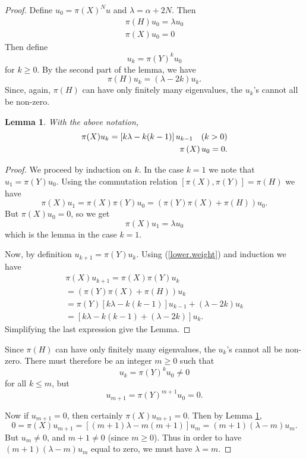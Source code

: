 \documentclass[12pt]{amsbook}
\theoremstyle{plain}
\newtheorem{lemma}[theorem]{Lemma}
\numberwithin{equation}{chapter}
\numberwithin{theorem}{chapter}
\begin{document}
\begin{proof}
Define $u_{0}=\pi(X)^{N}u$ and $\lambda=\alpha+2N$. Then
\begin{align}
\pi(H)u_{0}=\lambda u_{0}\label{weight}\\
\pi(X)u_{0}=0\label{kill}%
\end{align}
Then define
\[
u_{k}=\pi(Y)^{k}u_{0}%
\]
for $k\geq0$. By the second part of the lemma, we have
\begin{equation}
\pi(H)u_{k}=\left(  \lambda-2k\right)  u_{k}\text{.}\label{lower.weight}%
\end{equation}
Since, again, $\pi(H)$ can have only finitely many eigenvalues, the $u_{k}$'s
cannot all be non-zero.

\begin{lemma}
\label{raising}With the above notation,
\begin{align*}
\pi(X)u_{k}=\left[  k\lambda-k(k-1)\right]  u_{k-1}\text{\quad}(k>0)\\
\pi\left(  X\right)  u_{0}=0.
\end{align*}
\end{lemma}

\begin{proof}
We proceed by induction on $k$. In the case $k=1$ we note that $u_{1}%
=\pi(Y)u_{0}$. Using the commutation relation $\left[  \pi(X),\pi(Y)\right]
=\pi(H)$ we have
\[
\pi(X)u_{1}=\pi(X)\pi(Y)u_{0}=\left(  \pi(Y)\pi(X)+\pi(H)\right)
u_{0}\text{.}%
\]
But $\pi(X)u_{0}=0$, so we get
\[
\pi(X)u_{1}=\lambda u_{0}%
\]
which is the lemma in the case $k=1$.

Now, by definition $u_{k+1}=\pi(Y)u_{k}$. Using (\ref{lower.weight}) and
induction we have
\begin{align*}
\pi(X)u_{k+1}=\pi(X)\pi(Y)u_{k}\\
=\left(  \pi(Y)\pi(X)+\pi(H)\right)  u_{k}\\
=\pi(Y)\left[  k\lambda-k(k-1)\right]  u_{k-1}+(\lambda-2k)u_{k}\\
=\left[  k\lambda-k(k-1)+(\lambda-2k)\right]  u_{k}\text{.}%
\end{align*}
Simplifying the last expression give the Lemma.
\end{proof}

Since $\pi(H)$ can have only finitely many eigenvalues, the $u_{k}$'s cannot
all be non-zero. There must therefore be an integer $m\geq0$ such that
\[
u_{k}=\pi(Y)^{k}u_{0}\neq0
\]
for all $k\leq m$, but
\[
u_{m+1}=\pi(Y)^{m+1}u_{0}=0\text{.}%
\]

Now if $u_{m+1}=0$, then certainly $\pi(X)u_{m+1}=0$. Then by Lemma
\ref{raising},
\[
0=\pi(X)u_{m+1}=\left[  (m+1)\lambda-m(m+1)\right]  u_{m}=(m+1)(\lambda
-m)u_{m}\text{.}%
\]
But $u_{m}\neq0$, and $m+1\neq0$ (since $m\geq0$). Thus in order to have
$(m+1)(\lambda-m)u_{m}$ equal to zero, we must have $\lambda=m$.


\end{proof}
\end{document}
